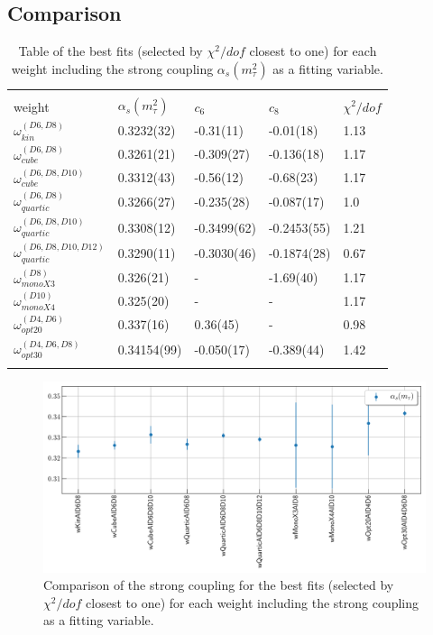\documentclass[../../index.tex]{subfiles}
\begin{document}
\subsection{Comparison}
\begin{table}[H]
  \centering
  \begin{tabular}{lllll}
    \toprule \\
    weight & $\alpha_s(m_\tau^2)$ & $c_6$ & $c_8$ & $\chi^2/dof$  \\
    $\omega_{kin}^{(D6,D8)}$ & 0.3232(32) & -0.31(11) & -0.01(18) & 1.13 \\
    $\omega_{cube}^{(D6,D8)}$ & 0.3261(21) & -0.309(27) & -0.136(18) & 1.17 \\
    $\omega_{cube}^{(D6,D8,D10)}$ & 0.3312(43) & -0.56(12) & -0.68(23) & 1.17 \\
    $\omega_{quartic}^{(D6,D8)}$ & 0.3266(27) & -0.235(28) & -0.087(17) & 1.0 \\
    $\omega_{quartic}^{(D6,D8,D10)}$ & 0.3308(12) & -0.3499(62) & -0.2453(55) & 1.21 \\
    $\omega_{quartic}^{(D6,D8,D10,D12)}$ & 0.3290(11)  & -0.3030(46) & -0.1874(28) & 0.67 \\
    $\omega_{monoX3}^{(D8)}$ & 0.326(21) & - & -1.69(40) & 1.17 \\
    $\omega_{monoX4}^{(D10)}$ & 0.325(20) & - & - & 1.17 \\
    $\omega_{opt20}^{(D4,D6)}$ & 0.337(16) & 0.36(45) & - & 0.98 \\
    $\omega_{opt30}^{(D4,D6,D8)}$ & 0.34154(99) & -0.050(17) & -0.389(44) & 1.42 \\
    \hline \\
    \bottomrule
  \end{tabular}
  \caption{Table of the best fits (selected by $\chi^2/dof$ closest to one) for
    each weight including the strong coupling $\alpha_s(m_\tau^2)$ as a fitting variable.}
  \label{table:fitCombinations}
\end{table}
\begin{figure}[H]
  \includegraphics[width=\textwidth]{./images/comparisonAlpha.png}
  \caption{Comparison of the strong coupling for the best fits (selected by
    $\chi^2/dof$ closest to one) for each weight including the strong coupling
    as a fitting variable.}
\end{figure}
\end{document}
